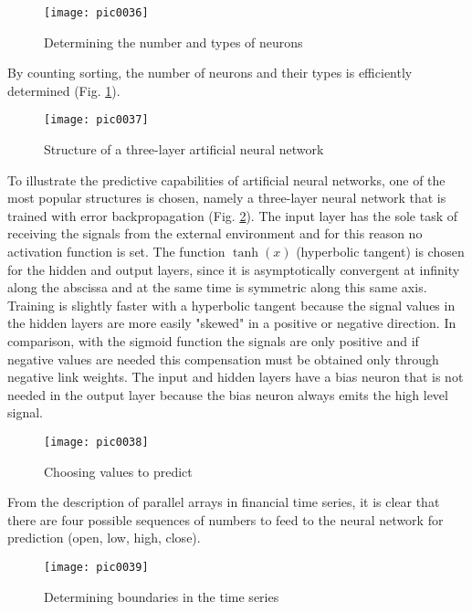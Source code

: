\begin{figure}[h]
\centering
\texttt{[image: pic0036]}
\caption{Determining the number and types of neurons}
\label{fig:pic0036}
\end{figure}
\FloatBarrier

By counting sorting, the number of neurons and their types is efficiently determined (Fig. \ref{fig:pic0036}).

\begin{figure}[h]
\centering
\texttt{[image: pic0037]}
\caption{Structure of a three-layer artificial neural network}
\label{fig:pic0037}
\end{figure}
\FloatBarrier

To illustrate the predictive capabilities of artificial neural networks, one of the most popular structures is chosen, namely a three-layer neural network that is trained with error backpropagation (Fig. \ref{fig:pic0037}). The input layer has the sole task of receiving the signals from the external environment and for this reason no activation function is set. The function $\tanh( x )$ (hyperbolic tangent) is chosen for the hidden and output layers, since it is asymptotically convergent at infinity along the abscissa and at the same time is symmetric along this same axis. Training is slightly faster with a hyperbolic tangent because the signal values in the hidden layers are more easily "skewed" in a positive or negative direction. In comparison, with the sigmoid function the signals are only positive and if negative values are needed this compensation must be obtained only through negative link weights. The input and hidden layers have a bias neuron that is not needed in the output layer because the bias neuron always emits the high level signal.

\begin{figure}[h]
\centering
\texttt{[image: pic0038]}
\caption{Choosing values to predict}
\label{fig:pic0038}
\end{figure}
\FloatBarrier

From the description of parallel arrays in financial time series, it is clear that there are four possible sequences of numbers to feed to the neural network for prediction (open, low, high, close).

\begin{figure}[h]
\centering
\texttt{[image: pic0039]}
\caption{Determining boundaries in the time series}
\label{fig:pic0039}
\end{figure}
\FloatBarrier

